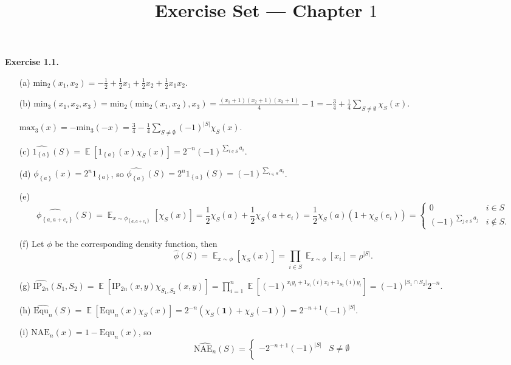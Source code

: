 \documentclass[a4paper]{article}
\title{Exercise Set --- Chapter $1$}
\date{}
\newenvironment{exercise}[1]{
	\par
	\noindent\textbf{Exercise #1.}\quad
}{
	\par
	\bigskip
}
\DeclareMathOperator{\E}{\mathbb E}
\newcommand{\pbra}[1]{{\left( #1 \right)}}
\newcommand{\cbra}[1]{{\left\{ #1 \right\}}}
\newcommand{\sbra}[1]{{\left[ #1 \right]}}
\begin{document}
\maketitle

\begin{exercise}{1.1}
    \begin{itemize}
        \item[(a)] $\text{min}_2(x_1,x_2)=-\frac12+\frac12x_1+\frac12x_2+\frac12x_1x_2$.
        \item[(b)] $\text{min}_3(x_1,x_2,x_3)=\text{min}_2(\text{min}_2(x_1,x_2),x_3)=\frac{(x_1+1)(x_2+1)(x_3+1)}4-1
            =-\frac34+\frac14\sum_{S\neq\emptyset}\chi_S(x)$.

            $\text{max}_3(x)=-\text{min}_3(-x)=\frac34-\frac14\sum_{S\neq\emptyset}(-1)^{|S|}\chi_S(x)$.
        \item[(c)] $\widehat{1_\cbra{a}}(S)=\E\sbra{1_\cbra{a}(x)\chi_S(x)}=2^{-n}(-1)^{\sum_{i\in S}a_i}$.
        \item[(d)] $\phi_\cbra{a}(x)=2^n1_\cbra{a}$, 
            so $\widehat{\phi_\cbra{a}}(S)=2^n\widehat{1_\cbra{a}}(S)=(-1)^{\sum_{i\in S}a_i}$.
        \item[(e)] 
            $$
            \widehat{\phi_\cbra{a,a+e_i}}(S)=\E_{x\sim\phi_\cbra{a,a+e_i}}\sbra{\chi_S(x)}
            =\frac12\chi_S(a)+\frac12\chi_S(a+e_i)=\frac12\chi_S(a)\pbra{1+\chi_S(e_i)}=\begin{cases}
                0&i\in S\\
                (-1)^{\sum_{j\in S}a_j}&i\notin S.
            \end{cases}
            $$
        \item[(f)] Let $\phi$ be the corresponding density function, then
            $$
            \widehat{\phi}(S)=\E_{x\sim\phi}\sbra{\chi_S(x)}=\prod_{i\in S}\E_{x\sim\phi}\sbra{x_i}=\rho^{|S|}.
            $$
        \item[(g)] $\widehat{\text{IP}_{2n}}(S_1,S_2)=\E\sbra{\text{IP}_{2n}(x,y)\chi_{S_1,S_2}(x,y)}
            =\prod_{i=1}^n\E\sbra{(-1)^{x_iy_i+1_{S_1}(i)x_i+1_{S_2}(i)y_i}}=(-1)^{|S_1\cap S_2|}2^{-n}$.
        \item[(h)] $\widehat{\text{Equ}_n}(S)=\E\sbra{\text{Equ}_n(x)\chi_S(x)}=2^{-n}\pbra{\chi_S(\bm1)+\chi_S(\bm{-1})}
            =2^{-n+1}(-1)^{|S|}.$
        \item[(i)] $\text{NAE}_n(x)=1-\text{Equ}_n(x)$, so 
            $$
            \widehat{\text{NAE}_n}(S)=\begin{cases}
                -2^{-n+1}(-1)^{|S|}&S\neq\emptyset\\

\end{cases}$$
\end{itemize}
\end{exercise}
\end{document}
